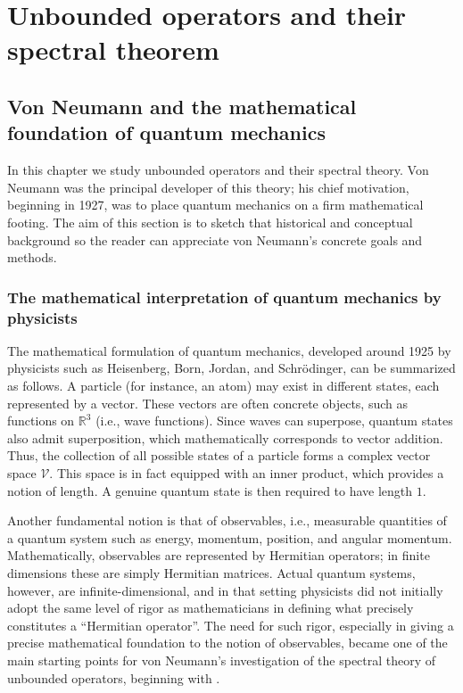 \documentclass[12pt,b5paper,notitlepage]{article}
\theoremstyle{definition}
\theoremstyle{plain}
\newcommand{\Rbb}{\mathbb R}
\newcommand{\MV}{\mathcal V}
\numberwithin{equation}{section}
\begin{document}
\section{Unbounded operators and their spectral theorem}\label{lb292}


\subsection{Von Neumann and the mathematical foundation of quantum mechanics}\label{lb291}

In this chapter we study unbounded operators and their spectral theory. Von Neumann was the principal developer of this theory; his chief motivation, beginning in 1927, was to place quantum mechanics on a firm mathematical footing. The aim of this section is to sketch that historical and conceptual background so the reader can appreciate von Neumann's concrete goals and methods.






\subsubsection{The mathematical interpretation of quantum mechanics by physicists}

The mathematical formulation of quantum mechanics, developed around 1925 by physicists such as Heisenberg, Born, Jordan, and Schr\"odinger, can be summarized as follows. A particle (for instance, an atom) may exist in different states, each represented by a vector. These vectors are often concrete objects, such as functions on $\Rbb^3$ (i.e., wave functions). Since waves can superpose, quantum states also admit superposition, which mathematically corresponds to vector addition. Thus, the collection of all possible states of a particle forms a complex vector space $\MV$. This space is in fact equipped with an inner product, which provides a notion of length. A genuine quantum state is then required to have length $1$.

Another fundamental notion is that of observables, i.e., measurable quantities of a quantum system such as energy, momentum, position, and angular momentum. Mathematically, observables are represented by Hermitian operators; in finite dimensions these are simply Hermitian matrices. Actual quantum systems, however, are infinite-dimensional, and in that setting physicists did not initially adopt the same level of rigor as mathematicians in defining what precisely constitutes a ``Hermitian operator''. The need for such rigor, especially in giving a precise mathematical foundation to the notion of observables, became one of the main starting points for von Neumann's investigation of the spectral theory of unbounded operators, beginning with \cite{vN27}.
\end{document}
